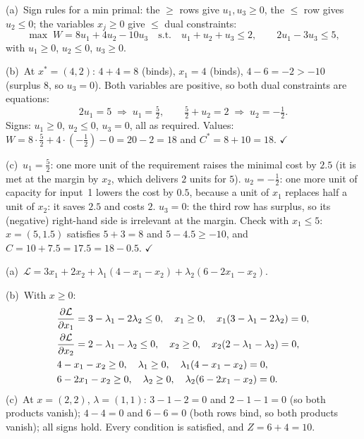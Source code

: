 \begin{solutions}
  \item (a)~Sign rules for a min primal: the $\ge$ rows give
        $u_{1},u_{3}\ge 0$, the $\le$ row gives $u_{2}\le 0$; the
        variables $x_{j}\ge 0$ give $\le$ dual constraints:
        \[
          \max\; W=8u_{1}+4u_{2}-10u_{3}
          \quad\text{s.t.}\quad
          u_{1}+u_{2}+u_{3}\le 2,\qquad 2u_{1}-3u_{3}\le 5,
        \]
        with $u_{1}\ge 0$, $u_{2}\le 0$, $u_{3}\ge 0$.

        (b)~At $x^{*}=(4,2)$: $4+4=8$ (binds), $x_{1}=4$ (binds),
        $4-6=-2>-10$ (surplus $8$, so $u_{3}=0$). Both variables are
        positive, so both dual constraints are equations:
        \[
          2u_{1}=5\;\Rightarrow\;u_{1}=\tfrac52,\qquad
          \tfrac52+u_{2}=2\;\Rightarrow\;u_{2}=-\tfrac12 .
        \]
        Signs: $u_{1}\ge 0$, $u_{2}\le 0$, $u_{3}=0$, all as required.
        Values: $W=8\cdot\tfrac52+4\cdot(-\tfrac12)-0=20-2=18$ and
        $C^{*}=8+10=18$. $\checkmark$

        (c)~$u_{1}=\tfrac52$: one more unit of the requirement raises the
        minimal cost by $2.5$ (it is met at the margin by $x_{2}$, which
        delivers $2$ units for $5$). $u_{2}=-\tfrac12$: one more unit of
        capacity for input~1 lowers the cost by $0.5$, because a unit of
        $x_{1}$ replaces half a unit of $x_{2}$: it saves $2.5$ and costs
        $2$. $u_{3}=0$: the third row has surplus, so its (negative)
        right-hand side is irrelevant at the margin. Check with
        $x_{1}\le 5$: $x=(5,1.5)$ satisfies $5+3=8$ and $5-4.5\ge -10$,
        and $C=10+7.5=17.5=18-0.5$. $\checkmark$

  \item (a)~$\mathcal{L}=3x_{1}+2x_{2}+\lambda_{1}(4-x_{1}-x_{2})
        +\lambda_{2}(6-2x_{1}-x_{2})$.

        (b)~With $x\ge 0$:
        \[
          \begin{aligned}
            &\frac{\partial \mathcal{L}}{\partial x_{1}}=3-\lambda_{1}-2\lambda_{2}\le 0,\quad
             x_{1}\ge 0,\quad x_{1}(3-\lambda_{1}-2\lambda_{2})=0,\\
            &\frac{\partial \mathcal{L}}{\partial x_{2}}=2-\lambda_{1}-\lambda_{2}\le 0,\quad
             x_{2}\ge 0,\quad x_{2}(2-\lambda_{1}-\lambda_{2})=0,\\
            &4-x_{1}-x_{2}\ge 0,\quad \lambda_{1}\ge 0,\quad
             \lambda_{1}(4-x_{1}-x_{2})=0,\\
            &6-2x_{1}-x_{2}\ge 0,\quad \lambda_{2}\ge 0,\quad
             \lambda_{2}(6-2x_{1}-x_{2})=0 .
          \end{aligned}
        \]
        (c)~At $x=(2,2)$, $\lambda=(1,1)$: $3-1-2=0$ and $2-1-1=0$ (so
        both products vanish); $4-4=0$ and $6-6=0$ (both rows bind, so
        both products vanish); all signs hold. Every condition is
        satisfied, and $Z=6+4=10$.


\end{solutions}
